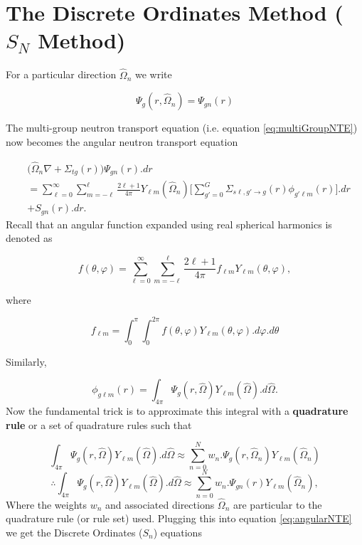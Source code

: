 \documentclass[11pt,letterpaper,titlepage]{article}
\numberwithin{equation}{section}
\begin{document}
\newpage
{}
\section{The Discrete Ordinates Method ($S_N$ Method)}
For a particular direction $\hat{\Omega}_n$ we write

$$\Psi_g (r,\hat{\Omega}_n) = \Psi_{gn}(r)$$

The multi-group neutron transport equation (i.e. equation \ref{eq:multiGroupNTE}) now becomes the angular neutron transport equation


\begin{equation} \label{eq:angularNTE}
\begin{aligned}
&\biggr(\hat{\Omega}_n\nabla +\Sigma_{tg} (r)\biggr)  \Psi_{gn} (r).dr\\
&= \sum_{\ell=0}^{\infty}\sum_{m=-\ell}^{\ell} \frac{2\ell+1}{4\pi}Y_{\ell m}(\hat{\Omega}_n)
\biggr[ \sum_{g'=0}^{G}
\Sigma_{s\ell,g'{\to}g} (r)
\phi_{g'\ell m} (r)
\biggr] .dr\\
&+  S_{gn} (r).dr.
\end{aligned}
\end{equation}
\newline
Recall that an angular function expanded using real spherical harmonics is denoted as

$$f(\theta,\varphi) = \sum_{\ell=0}^\infty \sum_{m=-\ell}^\ell  \frac{2\ell+1}{4\pi} f_{\ell m}Y_{\ell m} (\theta,\varphi),$$

\noindent where

$$f_{\ell m} = \int_0^\pi \int_0^{2\pi} f(\theta,\varphi) Y_{\ell m}(\theta,\varphi)    .d\varphi.d\theta$$

\noindent Similarly,

\begin{equation*}
\phi_{g\ell m}(r) = \int_{4\pi} \Psi_g(r,\hat{\Omega}) Y_{\ell m}(\hat{\Omega}).d\hat{\Omega}.
\end{equation*}
\newline
\noindent Now the fundamental trick is to approximate this integral with a \textbf{quadrature rule} or a set of quadrature rules such that

\begin{equation*}
\int_{4\pi} \Psi_g(r,\hat{\Omega}) Y_{\ell m}(\hat{\Omega}).d\hat{\Omega} \approx \sum_{n=0}^{N} w_n . \Psi_g(r,\hat{\Omega}_n) Y_{\ell m}(\hat{\Omega}_n)
\end{equation*}
\begin{equation}
\therefore 
\int_{4\pi} \Psi_g(r,\hat{\Omega}) Y_{\ell m}(\hat{\Omega}).d\hat{\Omega} \approx \sum_{n=0}^{N} w_n . \Psi_{gn}(r) Y_{\ell m}(\hat{\Omega}_n),
\end{equation}
\newline
Where the weights $w_n$ and associated directions $\hat{\Omega}_n$ are particular to the quadrature rule (or rule set) used.
Plugging this into equation \ref{eq:angularNTE} we get the Discrete Ordinates ($S_n$) equations
\end{document}
